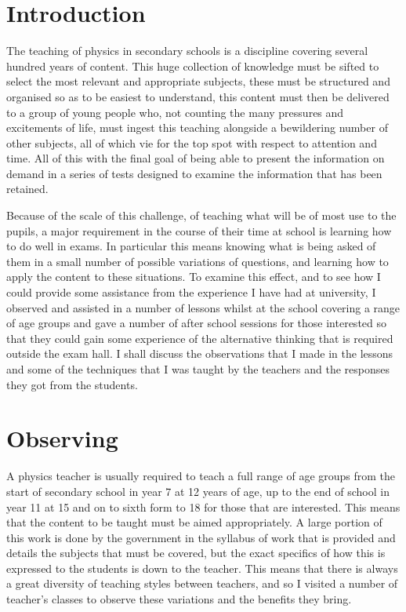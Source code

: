 
\section{Introduction} %
\label{sec:introduction}
	The teaching of physics in secondary schools is a discipline covering several hundred years of content. This huge collection of knowledge must be sifted to select the most relevant and appropriate subjects, these must be structured and organised so as to be easiest to understand, this content must then be delivered to a group of young people who, not counting the many pressures and excitements of life, must ingest this teaching alongside a bewildering number of other subjects, all of which vie for the top spot with respect to attention and time. All of this with the final goal of being able to present the information on demand in a series of tests designed to examine the information that has been retained.

	Because of the scale of this challenge, of teaching what will be of most use to the pupils, a major requirement in the course of their time at school is learning how to do well in exams. In particular this means knowing what is being asked of them in a small number of possible variations of questions, and learning how to apply the content to these situations. To examine this effect, and to see how I could provide some assistance from the experience I have had at university, I observed and assisted in a number of lessons whilst at the school covering a range of age groups and gave a number of after school sessions for those interested so that they could gain some experience of the alternative thinking that is required outside the exam hall. I shall discuss the observations that I made in the lessons and some of the techniques that I was taught by the teachers and the responses they got from the students.

\section{Observing} %
\label{sec:observing}
	A physics teacher is usually required to teach a full range of age groups from the start of secondary school in year 7 at 12 years of age, up to the end of school in year 11 at 15 and on to sixth form to 18 for those that are interested. This means that the content to be taught must be aimed appropriately. A large portion of this work is done by the government in the syllabus of work that is provided and details the subjects that must be covered, but the exact specifics of how this is expressed to the students is down to the teacher. This means that there is always a great diversity of teaching styles between teachers, and so I visited a number of teacher's classes to observe these variations and the benefits they bring.


